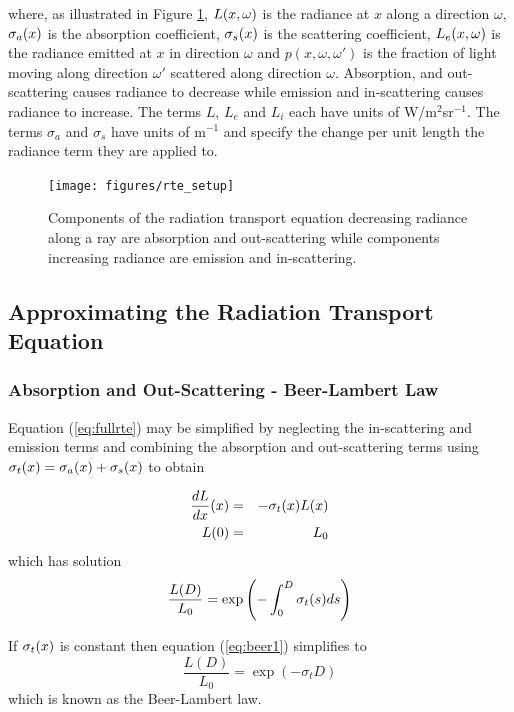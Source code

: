 \noindent where, as illustrated in Figure \ref{figRadiance},
$L(x,\omega)$ is the radiance at $x$ along a direction $\omega$, $\sigma_a(x)$
is the absorption coefficient, $\sigma_s(x)$ is the scattering
coefficient, $L_e(x,\omega)$ is the radiance emitted at $x$ in direction
$\omega$ and $p(x,\omega,\omega')$ is the fraction of light moving
along direction $\omega'$ scattered along direction $\omega$.
Absorption, and out-scattering causes radiance to decrease while
emission and in-scattering causes radiance to increase. The terms $L$, $L_e$ and $L_i$
each have units of W/m$^2$sr$^{-1}$.  The terms $\sigma_a$ and $\sigma_s$ have units of
m$^{-1}$ and specify the change per unit length the radiance term they are applied to.
\begin{figure}[\figoptions]
\begin{center}
\texttt{[image: figures/rte\_setup]}
\end{center}
\caption{Components of the radiation transport equation decreasing radiance along a ray are
absorption and out-scattering while components increasing radiance are emission and in-scattering.}
\label{figRadiance}
\end{figure}

%
%

\subsection{Approximating the Radiation Transport Equation}

%
%

\subsubsection{Absorption and Out-Scattering - Beer-Lambert Law}
Equation (\ref{eq:fullrte}) may be simplified by neglecting the
in-scattering and emission terms and combining the absorption and
out-scattering terms using $\sigma_t(x)=\sigma_a(x)+\sigma_s(x)$ to obtain

\begin{eqnarray*}
\frac{dL}{dx}(x)&=&-\sigma_t(x) L(x)\\
L(0)&=&L_0
\end{eqnarray*}
which has solution
\begin{equation}
\label{eq:beer1} \frac{L(D)}{L_0}=\exp\left({-\int_0^D \sigma_t(s) ds}\right)
\end{equation}

If $\sigma_t(x)$ is constant then equation (\ref{eq:beer1}) simplifies
to
\begin{equation}
\label{eq:beer2} \frac{L(D)}{L_0}=\exp(-\sigma_t D)
\end{equation}
which is known as the Beer-Lambert law\cite{}.

